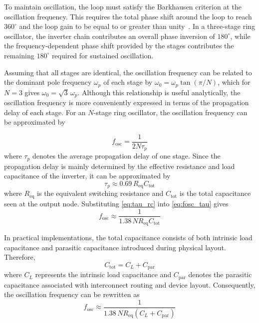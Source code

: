 \documentclass[conference,a4paper]{IEEEtran} %
\begin{document}
To maintain oscillation, the loop must satisfy the Barkhausen criterion at the
oscillation frequency. This requires the total phase shift around the loop to
reach $360^{\circ}$ and the loop gain to be equal to or greater than
unity~\cite{razavi_analog}. In a three-stage ring oscillator, the inverter chain
contributes an overall phase inversion of $180^{\circ}$, while the
frequency-dependent phase shift provided by the stages contributes the remaining
$180^{\circ}$ required for sustained oscillation.

Assuming that all stages are identical, the oscillation frequency can be
related to the dominant pole frequency $\omega_p$ of each stage by
$\omega_0 = \omega_p \tan(\pi/N)$, which for $N = 3$ gives
$\omega_0 = \sqrt{3}\,\omega_p$. Although this relationship is useful
analytically, the oscillation frequency is more conveniently expressed in terms
of the propagation delay of each stage. For an $N$-stage ring oscillator, the
oscillation frequency can be approximated by

\begin{equation}\label{eq:fosc_tau}
f_{\text{osc}} = \frac{1}{2N\tau_p}
\end{equation}
where $\tau_p$ denotes the average propagation delay of one stage. Since the
propagation delay is mainly determined by the effective resistance and load
capacitance of the inverter, it can be approximated by
\begin{equation}\label{eq:tau_rc}
\tau_p \approx 0.69\,R_{\text{eq}} C_{\text{tot}}
\end{equation}
where $R_{\text{eq}}$ is the equivalent switching resistance and $C_{\text{tot}}$
is the total capacitance seen at the output node. Substituting \eqref{eq:tau_rc}
into \eqref{eq:fosc_tau} gives
\begin{equation}\label{eq:fosc_rc}
f_{\text{osc}} \approx \frac{1}{1.38\,N R_{\text{eq}} C_{\text{tot}}}
\end{equation}

In practical implementations, the total capacitance consists of both intrinsic
load capacitance and parasitic capacitance introduced during physical layout.
Therefore,
\begin{equation}\label{eq:ctot}
C_{\text{tot}} = C_L + C_{\text{par}}
\end{equation}
where $C_L$ represents the intrinsic load capacitance and $C_{\text{par}}$
denotes the parasitic capacitance associated with interconnect routing and
device layout. Consequently, the oscillation frequency can be rewritten as
\begin{equation}\label{eq:fosc_par}
f_{\text{osc}} \approx \frac{1}{1.38\,N R_{\text{eq}}\left(C_L + C_{\text{par}}\right)}
\end{equation}
\end{document}
